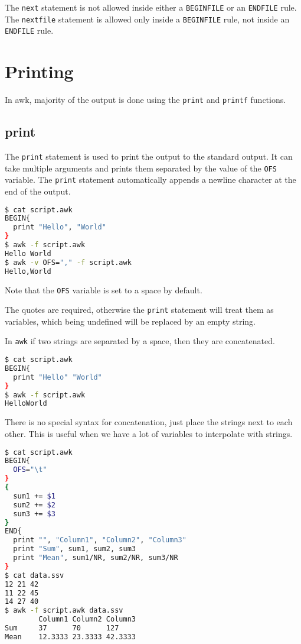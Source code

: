 The \lstinline|next| statement is not allowed inside either a \lstinline|BEGINFILE| or an \lstinline|ENDFILE| rule.
The \lstinline|nextfile| statement is allowed only inside a \lstinline|BEGINFILE| rule, not inside an \lstinline|ENDFILE| rule.


\section{Printing}

In awk, majority of the output is done using the \lstinline|print| and \lstinline|printf| functions.

\subsection{print}

The \lstinline|print| statement is used to print the output to the standard output.
It can take multiple arguments and prints them separated by the value of the \lstinline|OFS| variable.
The \lstinline|print| statement automatically appends a newline character at the end of the output.

\begin{lstlisting}[language=bash]
$ cat script.awk
BEGIN{
  print "Hello", "World"
}
$ awk -f script.awk
Hello World
$ awk -v OFS="," -f script.awk
Hello,World
\end{lstlisting}

Note that the \lstinline|OFS| variable is set to a space by default.

The quotes are required, otherwise the \lstinline|print| statement will treat them as variables,
which being undefined will be replaced by an empty string.

In \lstinline|awk| if two strings are separated by a space, then they are concatenated.

\begin{lstlisting}[language=bash]
$ cat script.awk
BEGIN{
  print "Hello" "World"
}
$ awk -f script.awk
HelloWorld
\end{lstlisting}

There is no special syntax for concatenation, just place the strings next to each other.
This is useful when we have a lot of variables to interpolate with strings.

\begin{lstlisting}[language=bash]
$ cat script.awk
BEGIN{
  OFS="\t"
}
{
  sum1 += $1
  sum2 += $2
  sum3 += $3
}
END{
  print "", "Column1", "Column2", "Column3"
  print "Sum", sum1, sum2, sum3
  print "Mean", sum1/NR, sum2/NR, sum3/NR
}
$ cat data.ssv
12 21 42
11 22 45
14 27 40
$ awk -f script.awk data.ssv
        Column1 Column2 Column3
Sum     37      70      127
Mean    12.3333 23.3333 42.3333
\end{lstlisting}



